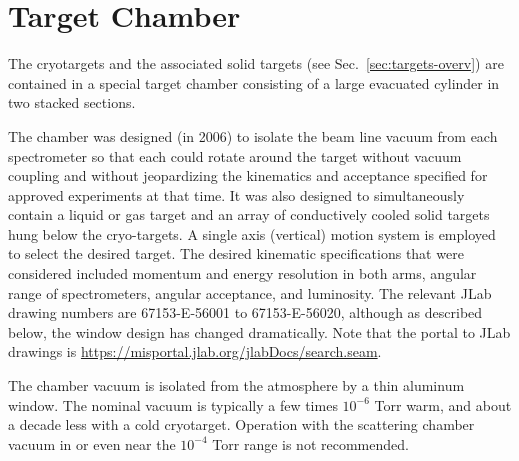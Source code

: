 \section[Target Chamber]{Target Chamber
\label{sec:target_chamb}
}


The cryotargets and the associated solid targets 
(see Sec.~\ref{sec:targets-overv}) 
are contained in a special target chamber consisting of a large evacuated  cylinder in two stacked sections. 

The chamber was designed (in 2006) to isolate the beam line vacuum from  each
spectrometer so that each could rotate
around the target without vacuum coupling and without jeopardizing
the  kinematics and acceptance specified
 for approved experiments at that time.  It was also designed to simultaneously
 contain a liquid or gas target and an array of conductively cooled solid targets hung below the cryo-targets. A single axis (vertical) motion system is employed to select the desired target.
The desired kinematic specifications that were
 considered included momentum and energy resolution in both arms,
 angular range of spectrometers, angular acceptance, and luminosity. The relevant JLab drawing numbers are 67153-E-56001 to 67153-E-56020, although as described below, the window design has changed dramatically. Note that the portal to JLab drawings is \url{https://misportal.jlab.org/jlabDocs/search.seam}.
 
The chamber vacuum is isolated from the atmosphere by a thin aluminum window. The nominal vacuum is typically a few times $10^{-6}$ Torr warm, and about a decade less with a cold cryotarget. Operation with the scattering chamber vacuum in or even near the $10^{-4}$ Torr range is not recommended. 

